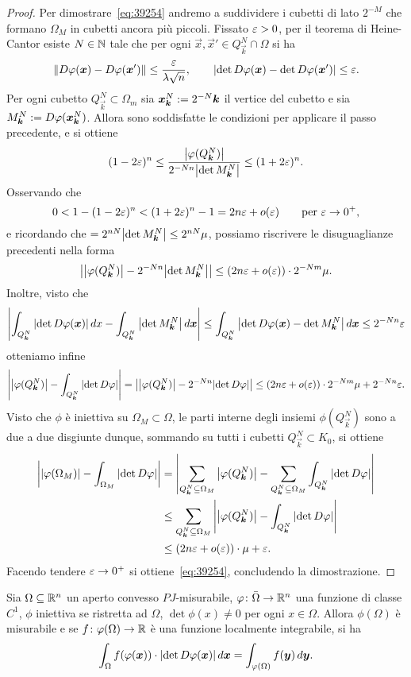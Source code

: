 \begin{proof}
Per dimostrare~\eqref{eq:39254} andremo a suddividere i cubetti di lato $2^{-M}$
che formano $\Omega_M$ in cubetti ancora più piccoli.
Fissato $\varepsilon>0$,
per il teorema di Heine-Cantor  
esiste $N\in {\mathbb N}$ tale che 
per ogni $\vec x, \vec x' \in Q^N_{\vec k}\cap \Omega$ si ha
\[
  {\left\Vert D\varphi(\boldsymbol x) - D\varphi(\boldsymbol x')\right\Vert} \le \frac{\varepsilon}{\lambda \sqrt n},
  \qquad
  {\left|\det D\varphi(\boldsymbol x) - \det D\varphi(\boldsymbol x')\right|} \le \varepsilon.
\]
Per ogni cubetto $Q^N_{\vec k} \subset \Omega_m$ sia $\boldsymbol x^N_{\boldsymbol k} := 2^{-N}\boldsymbol k$ 
il vertice del cubetto e sia $M^N_{\boldsymbol k} := D\varphi(\boldsymbol x^N_{\boldsymbol k})$.
Allora sono soddisfatte le condizioni per applicare il passo precedente, e si 
ottiene 
\[
(1-2\varepsilon)^n \le \frac{{\left|\varphi(Q^N_{\boldsymbol k})\right|}}{2^{-Nn}{\left|\det M^N_{\boldsymbol k}\right|}} \le (1+2\varepsilon)^n.
\]
Osservando che 
\[
 0 < 1-(1-2\varepsilon)^n < (1+2\varepsilon)^n - 1 = 2n\varepsilon + o(\varepsilon) \qquad \text{per $\varepsilon\to 0^+$},
\]
e ricordando che
$
= 2^{nN} {\left|\det M^N_{\boldsymbol k}\right|} \le 2^{nN} \mu
$,
possiamo riscrivere le disuguaglianze precedenti nella forma
\[
{\left|{\left|\varphi(Q^N_{\boldsymbol k})\right|} - 2^{-Nn} {\left|\det M^N_{\boldsymbol k}\right|}\right|}
\le (2n\varepsilon + o(\varepsilon))\cdot 2^{-Nm} \mu.
\]
Inoltre, visto che
\[
 {\left|\int_{Q^N_{\boldsymbol k}} {\left|\det D\varphi(\boldsymbol x)\right|}\, dx - 
 \int_{Q^N_{\boldsymbol k}} {\left|\det M^N_{\boldsymbol k}\right|}\, d\boldsymbol x\right|}
 \le \int_{Q^N_{\boldsymbol k}} {\left|\det D\varphi(\boldsymbol x) - \det M^N_{\boldsymbol k}\right|}\, d\boldsymbol x
 \le 2^{-Nn} \varepsilon
\]
otteniamo infine 
\[
{\left|{\left|\varphi(Q^N_{\boldsymbol k})\right|} - \int_{Q^N_{\boldsymbol k}} {\left|\det D\varphi\right|}\right|}
= {\left|{\left|\varphi(Q^N_{\boldsymbol k})\right|} - 2^{-Nn} {\left|\det D\varphi\right|}\right|}
\le (2n\varepsilon + o(\varepsilon))\cdot 2^{-Nm} \mu + 2^{-Nn} \varepsilon.
\]
Visto che $\phi$ è iniettiva su $\Omega_M\subset \Omega$, 
le parti interne degli insiemi $\phi(Q^N_{\vec k})$ sono a due a due disgiunte 
dunque, sommando su tutti i cubetti $Q^N_{\vec k}\subset K_0$,
si ottiene
\begin{align*}
{\left|{\left|\varphi(\Omega_M)\right|} - \int_{\Omega_M} {\left|\det D\varphi\right|}\right|}
&={\left|\sum_{Q^N_{\boldsymbol k}\subseteq \Omega_M}
  {\left|\varphi(Q^N_{\boldsymbol k})\right|} - \sum_{Q^N_{\boldsymbol k}\subseteq \Omega_M}\int_{Q^N_{\boldsymbol k}} {\left|\det D\varphi\right|}\right|} \\
&\le \sum_{Q^N_{\boldsymbol k}\subseteq \Omega_M} 
  {\left|{\left|\varphi(Q^N_{\boldsymbol k})\right|} - \int_{Q^N_{\boldsymbol k}} {\left|\det D\varphi\right|}\right|}\\
  &\le (2n\varepsilon + o(\varepsilon))\cdot \mu + \varepsilon.
\end{align*}
Facendo tendere $\varepsilon\to 0^+$ si ottiene~\eqref{eq:39254}, concludendo la dimostrazione.
\end{proof}


\begin{theorem}
  \label{th:cambio-variabili}
Sia $\Omega \subseteq {\mathbb R}^n$ un aperto convesso $PJ$-misurabile, 
$\varphi\colon \bar \Omega \to {\mathbb R}^n$
una funzione di classe $C^1$, 
$\phi$ iniettiva se ristretta ad $\Omega$,
$\det\phi(x)\neq 0$ per ogni $x\in \Omega$.
Allora $\phi(\Omega)$ è misurabile e 
se $f\colon \varphi(\Omega)\to{\mathbb R}$ è una funzione localmente integrabile,
si ha 
\[
    \int_\Omega f(\varphi(\boldsymbol x))\cdot {\left|\det D \varphi(\boldsymbol x)\right|}\, d \boldsymbol x
    =
    \int_{\varphi(\Omega)} f(\boldsymbol y) \, d \boldsymbol y.
\]
\end{theorem}

